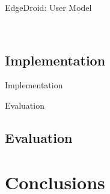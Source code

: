 \documentclass[aspectratio=1610]{beamer}
\begin{document}
\begin{frame}{EdgeDroid: User Model}
    \begin{center}
        \\
    \end{center}
\end{frame}

\subsection{Implementation}
\begin{frame}{Implementation}
    \begin{center}
        
    \end{center}
\end{frame}

\begin{frame}{Evaluation}

\end{frame}

\subsection{Evaluation}
\section{Conclusions}
\end{document}
